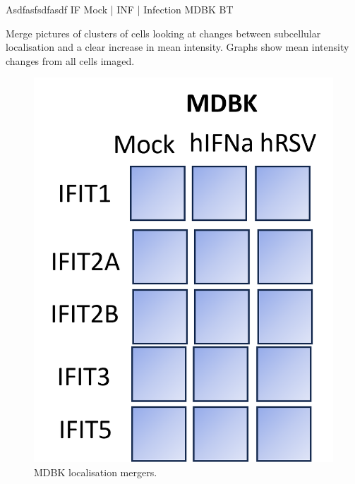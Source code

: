 Asdfasfsdfasdf \newline
IF Mock | INF | Infection \newline
MDBK BT

Merge pictures of clusters of cells looking at changes between subcellular localisation and a clear increase in mean intensity. Graphs show mean intensity changes from all cells imaged.

\begin{figure}
    \centering
    \includegraphics[width=1\linewidth]{07. Chapter 2/Figs/03. Localisation/01. mdbk merges.png}
    \caption[MDBK localisation mergers.]{MDBK localisation mergers.}
    \label{fig:MDBK localisation mergers}
\end{figure}



